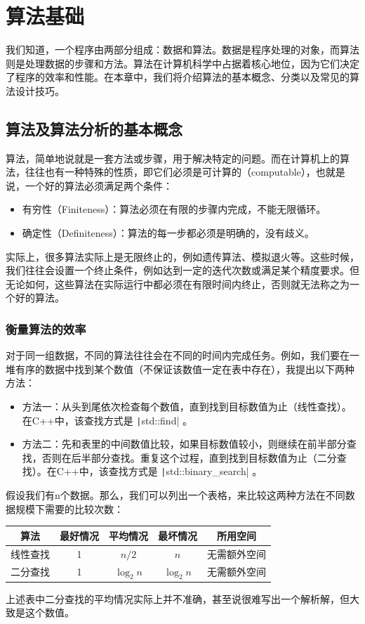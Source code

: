 \chapter{算法基础}\label{ch:algorithm}

我们知道，一个程序由两部分组成：数据和算法。数据是程序处理的对象，而算法则是处理数据的步骤和方法。算法在计算机科学中占据着核心地位，因为它们决定了程序的效率和性能。在本章中，我们将介绍算法的基本概念、分类以及常见的算法设计技巧。

\section{算法及算法分析的基本概念}

算法，简单地说就是一套方法或步骤，用于解决特定的问题。而在计算机上的算法，往往也有一种特殊的性质，即它们必须是可计算的（computable），也就是说，一个好的算法必须满足两个条件：
\begin{itemize}
    \item 有穷性（Finiteness）：算法必须在有限的步骤内完成，不能无限循环。
    \item 确定性（Definiteness）：算法的每一步都必须是明确的，没有歧义。
\end{itemize}
实际上，很多算法实际上是无限终止的，例如遗传算法、模拟退火等。这些时候，我们往往会设置一个终止条件，例如达到一定的迭代次数或满足某个精度要求。但无论如何，这些算法在实际运行中都必须在有限时间内终止，否则就无法称之为一个好的算法。

\subsection{衡量算法的效率}

对于同一组数据，不同的算法往往会在不同的时间内完成任务。例如，我们要在一堆有序的数据中找到某个数值（不保证该数值一定在表中存在），我提出以下两种方法：
\begin{itemize}
    \item 方法一：从头到尾依次检查每个数值，直到找到目标数值为止（线性查找）。在C++中，该查找方式是 \texttt|std::find| 。
    \item 方法二：先和表里的中间数值比较，如果目标数值较小，则继续在前半部分查找，否则在后半部分查找。重复这个过程，直到找到目标数值为止（二分查找）。在C++中，该查找方式是 \texttt|std::binary_search| 。
\end{itemize}
假设我们有n个数据。那么，我们可以列出一个表格，来比较这两种方法在不同数据规模下需要的比较次数：

\begin{table}[htbp]
    \centering
    \begin{tabular}{ccccc}
        \toprule
        算法 & 最好情况 & 平均情况 & 最坏情况 & 所用空间 \\
        \midrule
        线性查找 & 1 & $n/2$ & $n$ & 无需额外空间 \\
        二分查找 & 1 & $\log_2 n$ & $\log_2 n$ & 无需额外空间 \\
        \bottomrule
    \end{tabular}
\end{table}
上述表中二分查找的平均情况实际上并不准确，甚至说很难写出一个解析解，但大致是这个数值。

